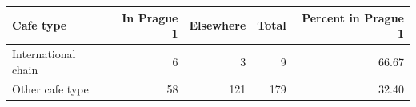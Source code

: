 \begingroup\footnotesize
\begin{tabular}{lrrrr}
  \toprule
Cafe type & In Prague 1 & Elsewhere & Total & Percent in Prague 1 \\ 
  \midrule
International chain &   6 &   3 &   9 & 66.67 \\ 
  Other cafe type &  58 & 121 & 179 & 32.40 \\ 
   \bottomrule
\end{tabular}
\endgroup
